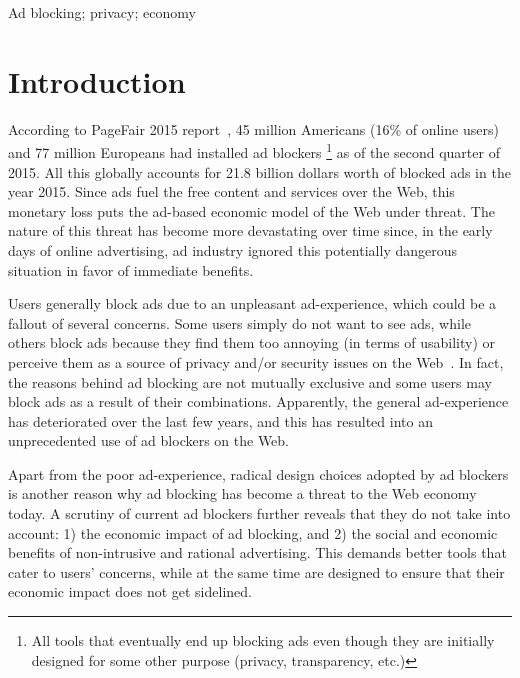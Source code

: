 \documentclass[conference]{IEEEtran}
\begin{document}
\begin{IEEEkeywords}
Ad blocking; 
privacy; 
economy
\end{IEEEkeywords}





\section{Introduction}
\label{sec:intro}

According to PageFair 2015 report~\cite{pagefaire_report_2015}, 45 million Americans (16\% of online users) and 77 million Europeans had installed ad blockers
\footnote{All tools 
that eventually end up blocking ads even though they are initially designed for some other purpose (privacy, transparency, etc.)
} 
as of the second quarter of 2015.
All this globally accounts for 21.8 billion dollars worth of blocked ads in the year 2015.
Since ads fuel the free content and services over the Web, this monetary loss puts the ad-based economic model of the Web under threat.
The nature of this threat has become more devastating over time since,
in the early days of online advertising, ad industry ignored this potentially dangerous situation in favor of immediate benefits.


Users generally block ads due to an unpleasant ad-experience, which could be a fallout of several concerns. 
Some users simply do not want to see ads, while others block ads because they find them too annoying (in terms of usability) or perceive them as a source of privacy and/or security issues on the Web~\cite{pagefaire_report_2015,targeted_ads_harmful,a_way_to_peace,profiling_adblockers,dcn_adblock_report,why_millennials_block_ads,why_people_block_ads,survey_search_engine_use,americans_reject_survey}.
In fact, the reasons behind ad blocking are not mutually exclusive and some users may block ads as a result of their combinations.
Apparently, the general ad-experience has deteriorated over the last few years, and this has resulted into an unprecedented use of ad blockers on the Web.


Apart from the poor ad-experience, radical design choices adopted 
by ad blockers is another reason why ad blocking has become a threat 
to the Web economy today. A scrutiny of current ad blockers further 
reveals that they do not take into account: 1) the economic impact 
of ad blocking, and 2) the social and economic benefits of non-intrusive 
and rational advertising. This demands better tools that cater to users' 
concerns, while at the same time are designed to ensure that their economic 
impact does not get sidelined.
\end{document}
